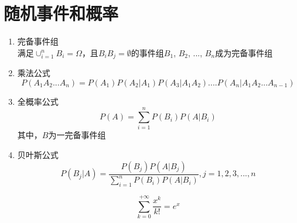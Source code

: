 \section{随机事件和概率}

\begin{enumerate}
\item 完备事件组 \\
满足$\cup_{i=1}^nB_i=\Omega$，且$B_iB_j = \emptyset$的事件组$B_1$, $B_2$, ..., $B_n$成为完备事件组

\item 乘法公式
\begin{equation}
P(A_1A_2...A_n) = P(A_1)P(A_2|A_1)P(A_3|A_1A_2)....P(A_n|A_1A_2...A_{n-1})
\end{equation}

\item 全概率公式
\begin{equation}
P(A) = \sum_{i=1}^nP(B_i)P(A|B_i)
\end{equation}
其中，$B$为一完备事件组

\item 贝叶斯公式
\begin{equation}
P(B_j|A) = \frac{P(B_j)P(A|B_j)}{\sum_{i=1}^nP(B_i)P(A|B_i)},  j = 1, 2, 3, ..., n
\end{equation}

\begin{equation}
\sum_{k=0}^{+\infty}\frac{x^k}{k!} = e^x
\end{equation}


\end{enumerate}
